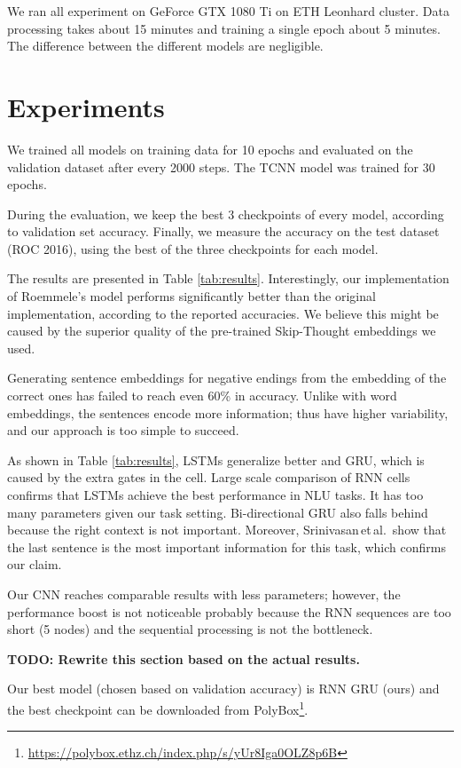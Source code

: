 \documentclass{article}
\begin{document}
We ran all experiment on GeForce GTX 1080 Ti on ETH Leonhard cluster. Data processing takes about 15 minutes and training a single epoch about 5 minutes. The difference between the different models are negligible.

\section{Experiments}\label{sec:experiments}
We trained all models on training data for 10 epochs and evaluated on the validation dataset after every 2000 steps. The TCNN model was trained for 30 epochs.

During the evaluation, we keep the best 3 checkpoints of every model, according to validation set accuracy. Finally, we measure the accuracy on the test dataset (ROC 2016), using the best of the three checkpoints for each model. 

The results are presented in Table \ref{tab:results}. Interestingly, our implementation of Roemmele's model performs significantly better than the original implementation, according to the reported accuracies. We believe this might be caused by the superior quality of the pre-trained Skip-Thought embeddings we used.

Generating sentence embeddings for negative endings from the embedding of the correct ones has failed to reach even 60\% in accuracy. Unlike with word embeddings, the sentences encode more information; thus have higher variability, and our approach is too simple to succeed.

As shown in Table \ref{tab:results}, LSTMs generalize better and GRU, which is caused by the extra gates in the cell. Large scale comparison of RNN cells confirms that LSTMs achieve the best performance in NLU tasks\citep{JozefowiczAnArchitectures}. It has too many parameters given our task setting. Bi-directional GRU also falls behind because the right context is not important. Moreover, Srinivasan\,et\,al.\,\citep{Srinivasan2018ATest} show that the last sentence is the most important information for this task, which confirms our claim. 

Our CNN reaches comparable results with less parameters; however, the performance boost is not noticeable probably because the RNN sequences are too short (5 nodes) and the sequential processing is not the bottleneck. 

\textbf{TODO: Rewrite this section based on the actual results.}

Our best model (chosen based on validation accuracy) is RNN GRU (ours) and the best checkpoint can be downloaded from PolyBox\footnote{\url{https://polybox.ethz.ch/index.php/s/yUr8Iga0OLZ8p6B}}.
\end{document}

